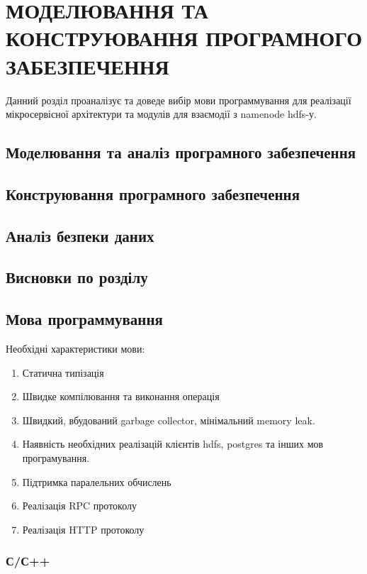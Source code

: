 
\chapter{МОДЕЛЮВАННЯ ТА КОНСТРУЮВАННЯ ПРОГРАМНОГО ЗАБЕЗПЕЧЕННЯ}

Данний розділ проаналізує та доведе вибір мови программування для реалізації мікросервісної архітектури 
та модулів для взаємодії з namenode hdfs-у.

\section{Моделювання та аналіз програмного забезпечення}
\section{Конструювання програмного забезпечення}
\section{Аналіз безпеки даних}
\section{Висновки по розділу}

\section{Мова программування}

Необхідні характеристики мови:

\begin{enumerate}
    \item Статична типізація
    \item Швидке компілювання та виконання операція
    \item Швидкий, вбудований garbage collector, мінімальний memory leak.
    \item Наявність необхідних реалізацій клієнтів hdfs, postgres та інших мов програмування.
    \item Підтримка паралельних обчислень
    \item Реалізація RPC протоколу
    \item Реалізація HTTP протоколу
\end{enumerate}

    \subsection{С/С++}


